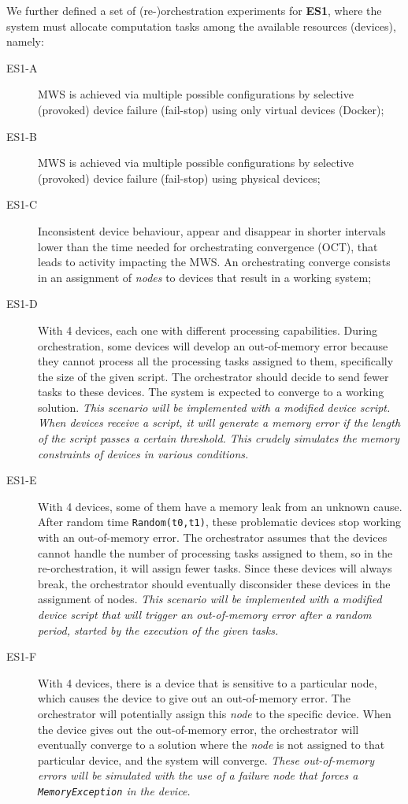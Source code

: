 We further defined a set of (re-)orchestration experiments for \textbf{ES1}, where the system must allocate computation tasks among the available resources (\ie devices), namely:
\begin{description}
    \item[ES1-A] MWS is achieved via multiple possible configurations by selective (provoked) device failure (fail-stop) using only virtual devices (\ie Docker);
    \item[ES1-B] MWS is achieved via multiple possible configurations by selective (provoked) device failure (fail-stop) using physical devices;
    \item[ES1-C] Inconsistent device behaviour, \eg appear and disappear in shorter intervals lower than the time needed for orchestrating convergence (OCT), that leads to activity impacting the MWS. An orchestrating converge consists in an assignment of \textit{nodes} to devices that result in a working system; 
    \item[ES1-D] With 4 devices, each one with different processing capabilities. During orchestration, some devices will develop an out-of-memory error because they cannot process all the processing tasks assigned to them, specifically the size of the given script. The orchestrator should decide to send fewer tasks to these devices. The system is expected to converge to a working solution. \textit{This scenario will be implemented with a modified device script. When devices receive a script, it will generate a memory error if the length of the script passes a certain threshold. This crudely simulates the memory constraints of devices in various conditions.}
    \item[ES1-E] With 4 devices, some of them have a memory leak from an unknown cause. After random time \texttt{Random(t0,t1)}, these problematic devices stop working with an out-of-memory error. The orchestrator assumes that the devices cannot handle the number of processing tasks assigned to them, so in the re-orchestration, it will assign fewer tasks. Since these devices will always break, the orchestrator should eventually disconsider these devices in the assignment of nodes. \textit{This scenario will be implemented with a modified device script that will trigger an out-of-memory error after a random period, started by the execution of the given tasks.}
    \item[ES1-F] With 4 devices, there is a device that is sensitive to a particular node, which causes the device to give out an out-of-memory error. The orchestrator will potentially assign this \textit{node} to the specific device. When the device gives out the out-of-memory error, the orchestrator will eventually converge to a solution where the \textit{node} is not assigned to that particular device, and the system will converge.  \textit{These out-of-memory errors will be simulated with the use of a failure \textit{node} that forces a \texttt{MemoryException} in the device.}

\end{description}
